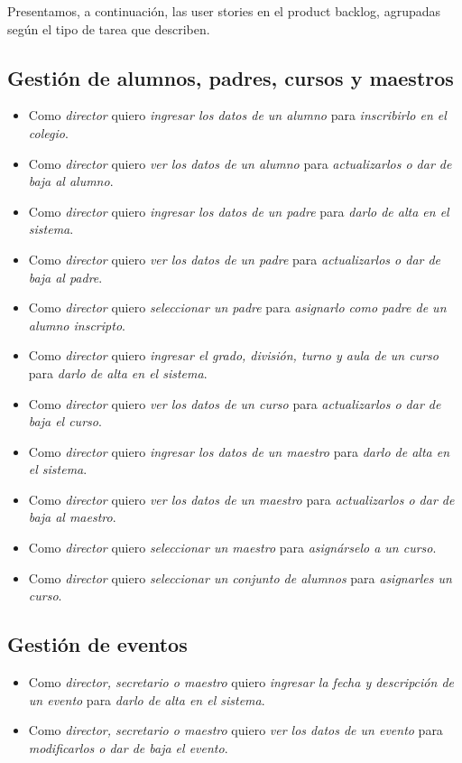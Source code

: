 \documentclass[a4paper, 10pt, twoside]{article}
\newenvironment{stories}{
  \begin{itemize}
}{
  \end{itemize}
}
\newcommand{\story}[3]{
  \item
  Como \emph{#1} quiero \emph{#2} para \emph{#3}.
}
\begin{document}
Presentamos, a continuación, las user stories en el product backlog, agrupadas según el tipo de tarea que describen.


\subsection{Gestión de alumnos, padres, cursos y maestros}

\begin{stories}
  \story{director}
        {ingresar los datos de un alumno}
        {inscribirlo en el colegio}

  \story{director}
        {ver los datos de un alumno}
        {actualizarlos o dar de baja al alumno}

  \story{director}
        {ingresar los datos de un padre}
        {darlo de alta en el sistema}

  \story{director}
        {ver los datos de un padre}
        {actualizarlos o dar de baja al padre}

  \story{director}
        {seleccionar un padre}
        {asignarlo como padre de un alumno inscripto}

  \story{director}
        {ingresar el grado, división, turno y aula de un curso}
        {darlo de alta en el sistema}

  \story{director}
        {ver los datos de un curso}
        {actualizarlos o dar de baja el curso}

  \story{director}
        {ingresar los datos de un maestro}
        {darlo de alta en el sistema}

  \story{director}
        {ver los datos de un maestro}
        {actualizarlos o dar de baja al maestro}

  \story{director}
        {seleccionar un maestro}
        {asignárselo a un curso}

  \story{director}
        {seleccionar un conjunto de alumnos}
        {asignarles un curso}
\end{stories}


\subsection{Gestión de eventos}

\begin{stories}
  \story{director, secretario o maestro}
        {ingresar la fecha y descripción de un evento}
        {darlo de alta en el sistema}

  \story{director, secretario o maestro}
        {ver los datos de un evento}
        {modificarlos o dar de baja el evento}
\end{stories}
\end{document}
